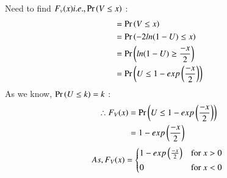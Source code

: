 \documentclass[journal,12pt,twocolumn]{IEEEtran}
\renewcommand\thesection{\arabic{section}}
\begin{document}
\begin{enumerate}[label=\textbf{\thesection.\arabic*},ref=\thesection.\theenumi]
\solution\\
Need to find $F_v(x) i.e., \Pr\left(V \le x\right)$ :
	\begin{align*}
  	   &= \Pr\left(V \le x\right)\\
  	   &= \Pr\left(-2ln(1-U) \le x\right)\\
  	   &= \Pr\left(ln(1-U) \ge \frac{-x}{2}\right) \\
 	   &= \Pr\left(U \le 1 - exp\left(\frac{-x}{2}\right)\right)
	\end{align*}
As we know, $\Pr\left(U \le k\right) = k$ :
	\begin{align*}
  		\therefore F_V(x) &=  \Pr\left(U \le 1 - exp\left(\frac{-x}{2}\right)\right)\\
  		&= 1 - exp\left(\frac{-x}{2}\right)
	\end{align*}
%	
	\begin{equation}
    		As,F_V(x) = 
    		\begin{cases*}
        1 - exp\brak{\frac{-x}{2}} & for $x > 0$ \\
        0 & for $x < 0$
    		\end{cases*}
	\end{equation}
\end{enumerate}
\end{document}

